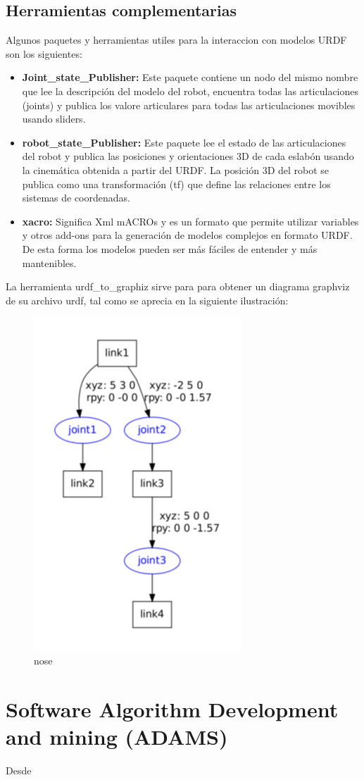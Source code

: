         
    \subsection{Herramientas complementarias}
    
        Algunos paquetes y herramientas utiles para la interaccion con modelos URDF son los siguientes:
      
        \begin{itemize}
            \item \textbf{Joint\_state\_Publisher:} Este paquete contiene un nodo del mismo nombre que lee la descripción del modelo del robot, encuentra todas las articulaciones (joints) y publica los valore articulares para todas las articulaciones movibles usando sliders.
            \item \textbf{robot\_state\_Publisher:} Este paquete lee el estado de las articulaciones del robot y publica las posiciones y orientaciones 3D de cada eslabón usando la cinemática obtenida a partir del URDF. La posición 3D del robot se publica como una transformación (tf) que define las relaciones entre los sistemas de coordenadas.
            \item \textbf{xacro:} Significa Xml mACROs y es un formato que permite utilizar variables y otros add-ons para la generación de modelos complejos en formato URDF. De esta forma los modelos pueden ser más fáciles de entender y más mantenibles.
        \end{itemize}      
        
        La herramienta urdf\_to\_graphiz sirve para para obtener un diagrama graphviz de su archivo urdf, tal como se aprecia en la siguiente ilustración:
        
        \begin{figure}[htb]
            \centering
            \includegraphics[width=0.35\linewidth]{Main/Chapter3/Images3/3-9/Esquema-de-los-componentes-de-un-fichero-urdf.png}
            \caption{nose}
            \label{f:Cap3-9_nose_nose}
        \end{figure} 
        
    \newpage

\section{Software Algorithm Development and mining (ADAMS)}
Desde

    
      
        
            
            
            

        
    
    